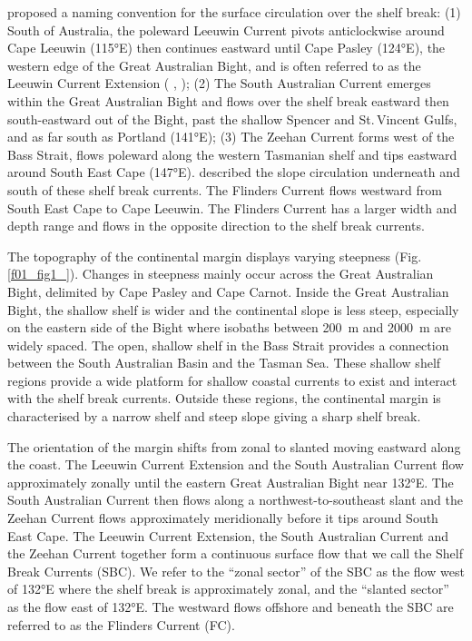 \documentclass[preprint,3p,review,12pt]{elsarticle}
\begin{document}
\citet{Ridgway2004} proposed a naming convention for the surface circulation over the shelf break: (1) South of Australia, the poleward Leeuwin Current pivots anticlockwise around Cape Leeuwin (\ang{115}E) then continues eastward until Cape Pasley (\ang{124}E), the western edge of the Great Australian Bight, and is often referred to as the Leeuwin Current Extension (\citeauthor{Ridgway2004} \citeyear{Ridgway2004}, \citeauthor{Batteen2007} \citeyear{Batteen2007}); (2) The South Australian Current emerges within the Great Australian Bight and flows over the shelf break eastward then south-eastward out of the Bight, past the shallow Spencer and St.\,Vincent Gulfs, and as far south as Portland (\ang{141}E); (3) The Zeehan Current forms west of the Bass Strait, flows poleward along the western Tasmanian shelf and tips eastward around South East Cape (\ang{147}E). 
\citet{Middleton2002} described the slope circulation underneath and south of these shelf break currents. The Flinders Current flows westward from South East Cape to Cape Leeuwin. The Flinders Current has a larger width and depth range and flows in the opposite direction to the shelf break currents.

The topography of the continental margin displays varying steepness (Fig.\,\ref{f01_fig1_}). Changes in steepness mainly occur across the Great Australian Bight, delimited by Cape Pasley and Cape Carnot. Inside the Great Australian Bight, the shallow shelf is wider and the continental slope is less steep, especially on the eastern side of the Bight where isobaths between \SI{200}{\meter} and \SI{2000}{\meter} are widely spaced. The open, shallow shelf in the Bass Strait provides a connection between the South Australian Basin and the Tasman Sea. These shallow shelf regions provide a wide platform for shallow coastal currents to exist and interact with the shelf break currents. Outside these regions, the continental margin is characterised by a narrow shelf and steep slope giving a sharp shelf break. 

The orientation of the margin shifts from zonal to slanted moving eastward along the coast. The Leeuwin Current Extension and the South Australian Current flow approximately zonally until the eastern Great Australian Bight near \ang{132}E. The South Australian Current then flows along a northwest-to-southeast slant and the Zeehan Current flows approximately meridionally before it tips around South East Cape. The Leeuwin Current Extension, the South Australian Current and the Zeehan Current together form a continuous surface flow that we call the Shelf Break Currents (SBC). We refer to the ``zonal sector'' of the SBC as the flow west of \ang{132}E where the shelf break is approximately zonal, and the ``slanted sector'' as the flow east of \ang{132}E. The westward flows offshore and beneath the SBC are referred to as the Flinders Current (FC).
\end{document}
